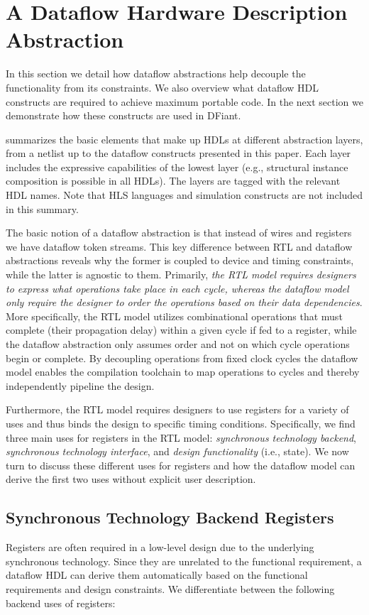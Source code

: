 \section{A Dataflow Hardware Description Abstraction}
\label{sec:motivation}
In this section we detail how dataflow abstractions help decouple the functionality from its constraints. We also overview what dataflow HDL constructs are required to achieve maximum portable code. In the next section we demonstrate how these constructs are used in DFiant.

 summarizes the basic elements that make up HDLs at different abstraction layers, from a netlist up to the dataflow constructs presented in this paper. Each layer includes the expressive capabilities of the lowest layer (e.g., structural instance composition is possible in all HDLs). The layers are tagged with the relevant HDL names. Note that HLS languages and simulation constructs are not included in this summary. 

The basic notion of a dataflow abstraction is that instead of wires and registers we have dataflow token streams. This key difference between RTL and dataflow abstractions reveals why the former is coupled to device and timing constraints, while the latter is agnostic to them. Primarily, \emph{the RTL model requires designers to express what operations take place in each cycle, whereas the dataflow model only require the designer to order the operations based on their data dependencies}. More specifically, the RTL model utilizes combinational operations that must complete (their propagation delay) within a given cycle if fed to a register, while the dataflow abstraction only assumes order and not on which cycle operations begin or complete. By decoupling operations from fixed clock cycles the dataflow model enables the compilation toolchain to map operations to cycles and thereby independently pipeline the design. 

Furthermore, the RTL model requires designers to use registers for a variety of uses and thus binds the design to specific timing conditions. Specifically, we find three main uses for registers in the RTL model: \emph{synchronous technology backend}, \emph{synchronous technology interface}, and \emph{design functionality} (i.e., state). We now turn to discuss these different uses for registers and how the dataflow model can derive the first two uses without explicit user description.

\subsection{Synchronous Technology Backend Registers}
Registers are often required in a low-level design due to the underlying synchronous technology. Since they are unrelated to the functional requirement, a dataflow HDL can derive them automatically based on the functional requirements and design constraints. 
We differentiate between the following backend uses of registers:
